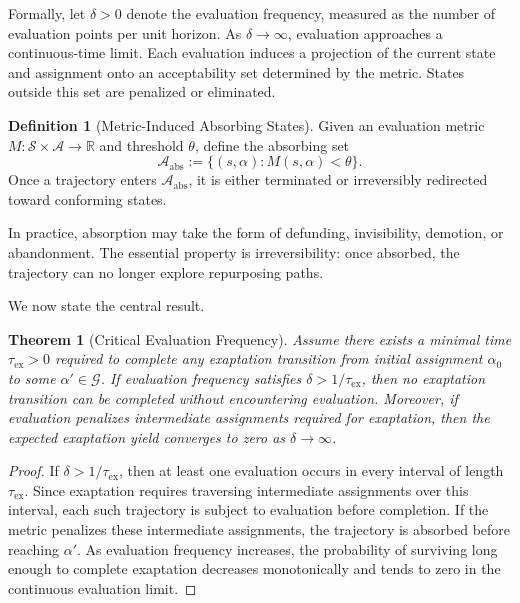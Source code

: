 \documentclass[11pt]{article}
\newtheorem{theorem}{Theorem}
\theoremstyle{definition}
\newtheorem{definition}{Definition}
\begin{document}
Formally, let $\delta > 0$ denote the evaluation frequency, measured as the number of evaluation points per unit horizon. As $\delta \to \infty$, evaluation approaches a continuous-time limit. Each evaluation induces a projection of the current state and assignment onto an acceptability set determined by the metric. States outside this set are penalized or eliminated.

\begin{definition}[Metric-Induced Absorbing States]
Given an evaluation metric $M:\mathcal{S}\times\mathcal{A}\to\mathbb{R}$ and threshold $\theta$, define the absorbing set
\[
\mathcal{A}_{\mathrm{abs}} := \{(s,\alpha) : M(s,\alpha) < \theta\}.
\]
Once a trajectory enters $\mathcal{A}_{\mathrm{abs}}$, it is either terminated or irreversibly redirected toward conforming states.
\end{definition}

In practice, absorption may take the form of defunding, invisibility, demotion, or abandonment. The essential property is irreversibility: once absorbed, the trajectory can no longer explore repurposing paths.

We now state the central result.

\begin{theorem}[Critical Evaluation Frequency]
Assume there exists a minimal time $\tau_{\mathrm{ex}}>0$ required to complete any exaptation transition from initial assignment $\alpha_0$ to some $\alpha'\in\mathcal{G}$. If evaluation frequency satisfies $\delta > 1/\tau_{\mathrm{ex}}$, then no exaptation transition can be completed without encountering evaluation. Moreover, if evaluation penalizes intermediate assignments required for exaptation, then the expected exaptation yield converges to zero as $\delta \to \infty$.
\end{theorem}

\begin{proof}
If $\delta > 1/\tau_{\mathrm{ex}}$, then at least one evaluation occurs in every interval of length $\tau_{\mathrm{ex}}$. Since exaptation requires traversing intermediate assignments over this interval, each such trajectory is subject to evaluation before completion. If the metric penalizes these intermediate assignments, the trajectory is absorbed before reaching $\alpha'$. As evaluation frequency increases, the probability of surviving long enough to complete exaptation decreases monotonically and tends to zero in the continuous evaluation limit.
\end{proof}
\end{document}
